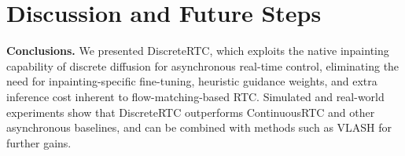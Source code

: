 \documentclass{article}
\begin{document}






\section{Discussion and Future Steps}
\label{sec:conclusion}
\textbf{Conclusions.}
We presented DiscreteRTC, which exploits the native inpainting capability of discrete diffusion for asynchronous real-time control, eliminating the need for inpainting-specific fine-tuning, heuristic guidance weights, and extra inference cost inherent to flow-matching-based RTC.
Simulated and real-world experiments show that DiscreteRTC outperforms ContinuousRTC and other asynchronous baselines, and can be combined with methods such as VLASH for further gains.
\end{document}
